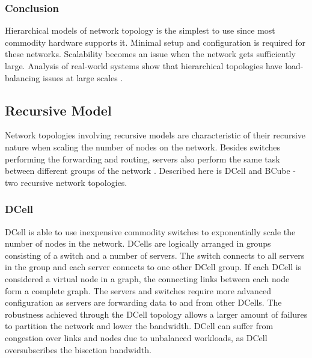\documentclass[12pt]{article}
\begin{document}

\subsubsection{Conclusion} \label{ssub:hierarchical-concl}


Hierarchical models of network topology is the simplest to use since most commodity hardware supports it. Minimal setup and configuration is required for these networks. Scalability becomes an issue when the network gets sufficiently large. Analysis of real-world systems show that hierarchical topologies have load-balancing issues at large scales \cite{singla2012jellyfish}.



\subsection{Recursive Model} \label{sub:net-recursive}

Network topologies involving recursive models are characteristic of their recursive nature when scaling the number of nodes on the network. Besides switches performing the forwarding and routing,  servers also perform the same task between different groups of the network \cite{wang2015survey, xia2016survey}. Described here is DCell \cite{guo2008dcell} and BCube \cite{guo2009bcube} - two recursive network topologies.

\subsubsection{DCell} \label{subp:dcell}

DCell \cite{guo2008dcell} is able to use inexpensive commodity switches to exponentially scale the number of nodes in the network. DCells are logically arranged in groups consisting of a switch and a number of servers. The switch connects to all servers in the group and each server connects to one other DCell group. If each DCell is considered a virtual node in a graph, the connecting links between each node form a complete graph. The servers and switches require more advanced configuration as servers are forwarding data to and from other DCells. The robustness achieved through the DCell topology allows a larger amount of failures to partition the network and lower the bandwidth. DCell can suffer from congestion over links and nodes due to unbalanced workloads, as DCell oversubscribes the bisection bandwidth.
\end{document}
